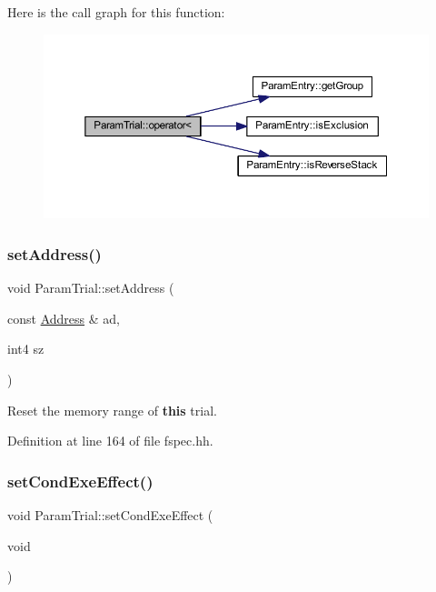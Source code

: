 Here is the call graph for this function\+:
\nopagebreak
\begin{figure}[H]
\begin{center}
\leavevmode
\includegraphics[width=350pt]{class_param_trial_ac234b0e0b800d4319bc212dd2eb088d8_cgraph}
\end{center}
\end{figure}
\mbox{\label{class_param_trial_ad7ca7f738c822caea264fb6bf7b2738d}} 
\subsubsection{\texorpdfstring{setAddress()}{setAddress()}}
{\footnotesize\ttfamily void Param\+Trial\+::set\+Address (\begin{DoxyParamCaption}\item[{const \mbox{\hyperlink{class_address}{Address}} \&}]{ad,  }\item[{int4}]{sz }\end{DoxyParamCaption})\hspace{0.3cm}{\ttfamily [inline]}}



Reset the memory range of {\bfseries{this}} trial. 



Definition at line 164 of file fspec.\+hh.

\mbox{\label{class_param_trial_a32ff81889bdb636331549123ac1ca2e6}} 
\subsubsection{\texorpdfstring{setCondExeEffect()}{setCondExeEffect()}}
{\footnotesize\ttfamily void Param\+Trial\+::set\+Cond\+Exe\+Effect (\begin{DoxyParamCaption}\item[{void}]{ }\end{DoxyParamCaption})\hspace{0.3cm}{\ttfamily [inline]}}



